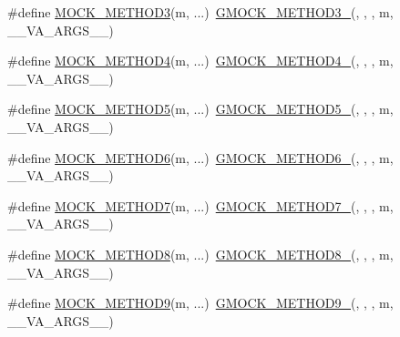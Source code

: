\begin{DoxyCompactItemize}
\item 
\#define \hyperlink{gmock-generated-function-mockers_8h_af11ebf7fafb231778846dba77725cfdd}{M\+O\+C\+K\+\_\+\+M\+E\+T\+H\+O\+D3}(m, ...)~\hyperlink{gmock-generated-function-mockers_8h_af7c77ba511c631de02bb8c45a6ed3045}{G\+M\+O\+C\+K\+\_\+\+M\+E\+T\+H\+O\+D3\+\_\+}(, , , m, \+\_\+\+\_\+\+V\+A\+\_\+\+A\+R\+G\+S\+\_\+\+\_\+)
\item 
\#define \hyperlink{gmock-generated-function-mockers_8h_a111d70ee62b09089ec3cd7d6662e5cd2}{M\+O\+C\+K\+\_\+\+M\+E\+T\+H\+O\+D4}(m, ...)~\hyperlink{gmock-generated-function-mockers_8h_ab6430f2cfad9de4aca5258ea559294bb}{G\+M\+O\+C\+K\+\_\+\+M\+E\+T\+H\+O\+D4\+\_\+}(, , , m, \+\_\+\+\_\+\+V\+A\+\_\+\+A\+R\+G\+S\+\_\+\+\_\+)
\item 
\#define \hyperlink{gmock-generated-function-mockers_8h_a9b83bed95e89664e61d3a36174de0052}{M\+O\+C\+K\+\_\+\+M\+E\+T\+H\+O\+D5}(m, ...)~\hyperlink{gmock-generated-function-mockers_8h_a9e3ecd392499ab19a4a6d3adcabf56f6}{G\+M\+O\+C\+K\+\_\+\+M\+E\+T\+H\+O\+D5\+\_\+}(, , , m, \+\_\+\+\_\+\+V\+A\+\_\+\+A\+R\+G\+S\+\_\+\+\_\+)
\item 
\#define \hyperlink{gmock-generated-function-mockers_8h_add8f8f786444c2c85ac67f550dbde5a6}{M\+O\+C\+K\+\_\+\+M\+E\+T\+H\+O\+D6}(m, ...)~\hyperlink{gmock-generated-function-mockers_8h_ad0ca7f6973a076d0af4c953f8ed91842}{G\+M\+O\+C\+K\+\_\+\+M\+E\+T\+H\+O\+D6\+\_\+}(, , , m, \+\_\+\+\_\+\+V\+A\+\_\+\+A\+R\+G\+S\+\_\+\+\_\+)
\item 
\#define \hyperlink{gmock-generated-function-mockers_8h_a01f3369877a0c52f59c006fbd54b6a10}{M\+O\+C\+K\+\_\+\+M\+E\+T\+H\+O\+D7}(m, ...)~\hyperlink{gmock-generated-function-mockers_8h_ab98a8399ba62b53b375c2807f4d39d2f}{G\+M\+O\+C\+K\+\_\+\+M\+E\+T\+H\+O\+D7\+\_\+}(, , , m, \+\_\+\+\_\+\+V\+A\+\_\+\+A\+R\+G\+S\+\_\+\+\_\+)
\item 
\#define \hyperlink{gmock-generated-function-mockers_8h_ae77220bef9ab254c331b9026a3d18dba}{M\+O\+C\+K\+\_\+\+M\+E\+T\+H\+O\+D8}(m, ...)~\hyperlink{gmock-generated-function-mockers_8h_aa84a36427c44505207b7cad5dec7ad67}{G\+M\+O\+C\+K\+\_\+\+M\+E\+T\+H\+O\+D8\+\_\+}(, , , m, \+\_\+\+\_\+\+V\+A\+\_\+\+A\+R\+G\+S\+\_\+\+\_\+)
\item 
\#define \hyperlink{gmock-generated-function-mockers_8h_ad6b30841fe780994d216cc8829cc127f}{M\+O\+C\+K\+\_\+\+M\+E\+T\+H\+O\+D9}(m, ...)~\hyperlink{gmock-generated-function-mockers_8h_aa820171a19cc587c247dbe05cbffc55f}{G\+M\+O\+C\+K\+\_\+\+M\+E\+T\+H\+O\+D9\+\_\+}(, , , m, \+\_\+\+\_\+\+V\+A\+\_\+\+A\+R\+G\+S\+\_\+\+\_\+)
\item 

\end{DoxyCompactItemize}
